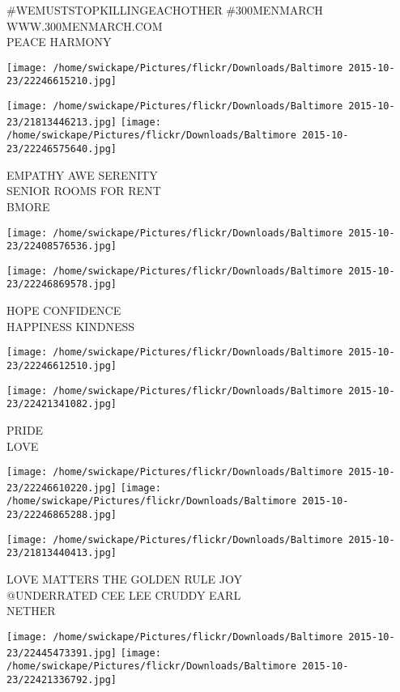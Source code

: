 \documentclass[10pt,letterpaper]{article}
\begin{document}
\#WEMUSTSTOPKILLINGEACHOTHER \#300MENMARCH WWW.300MENMARCH.COM\\
PEACE HARMONY
\pagebreak

\texttt{[image: /home/swickape/Pictures/flickr/Downloads/Baltimore 2015-10-23/22246615210.jpg]}

\vspace{0.25in}
\texttt{[image: /home/swickape/Pictures/flickr/Downloads/Baltimore 2015-10-23/21813446213.jpg]}
\texttt{[image: /home/swickape/Pictures/flickr/Downloads/Baltimore 2015-10-23/22246575640.jpg]}

EMPATHY AWE SERENITY\\
SENIOR ROOMS FOR RENT\\
BMORE
\pagebreak

\texttt{[image: /home/swickape/Pictures/flickr/Downloads/Baltimore 2015-10-23/22408576536.jpg]}

\vspace{0.25in}
\texttt{[image: /home/swickape/Pictures/flickr/Downloads/Baltimore 2015-10-23/22246869578.jpg]}

HOPE CONFIDENCE\\
HAPPINESS KINDNESS
\pagebreak

\texttt{[image: /home/swickape/Pictures/flickr/Downloads/Baltimore 2015-10-23/22246612510.jpg]}

\vspace{0.25in}
\texttt{[image: /home/swickape/Pictures/flickr/Downloads/Baltimore 2015-10-23/22421341082.jpg]}

PRIDE\\
LOVE
\pagebreak

\texttt{[image: /home/swickape/Pictures/flickr/Downloads/Baltimore 2015-10-23/22246610220.jpg]}
\texttt{[image: /home/swickape/Pictures/flickr/Downloads/Baltimore 2015-10-23/22246865288.jpg]}

\vspace{0.25in}
\texttt{[image: /home/swickape/Pictures/flickr/Downloads/Baltimore 2015-10-23/21813440413.jpg]}

LOVE MATTERS THE GOLDEN RULE JOY\\
@UNDERRATED CEE LEE CRUDDY EARL\\
NETHER
\pagebreak

\texttt{[image: /home/swickape/Pictures/flickr/Downloads/Baltimore 2015-10-23/22445473391.jpg]}
\texttt{[image: /home/swickape/Pictures/flickr/Downloads/Baltimore 2015-10-23/22421336792.jpg]}
\end{document}
